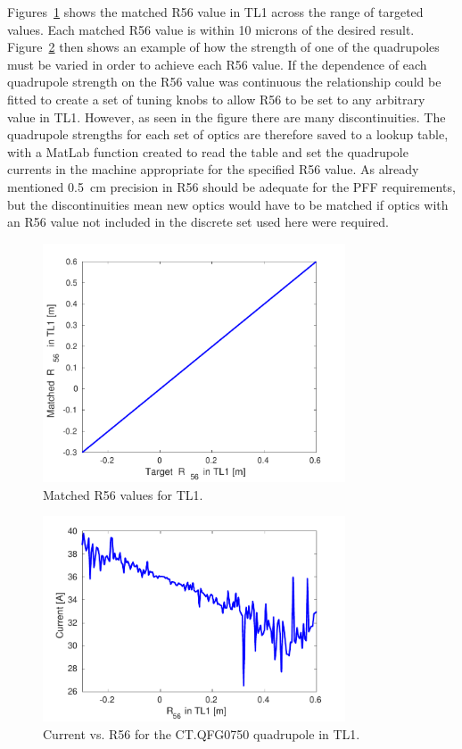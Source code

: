 Figures~\ref{f:r56MatchedVsTarget} shows the matched R56 value in TL1 across the range of targeted values. Each matched R56 value is within 10 microns of the desired result. Figure~\ref{f:CTQFG0750} then shows an example of how the strength of one of the quadrupoles must be varied in order to achieve each R56 value. If the dependence of each quadrupole strength on the R56 value was continuous the relationship could be fitted to create a set of tuning knobs to allow R56 to be set to any arbitrary value in TL1. However, as seen in the figure there are many discontinuities. The quadrupole strengths for each set of optics are therefore saved to a lookup table, with a MatLab function created to read the table and set the quadrupole currents in the machine appropriate for the specified R56 value. As already mentioned 0.5~cm precision in R56 should be adequate for the PFF requirements, but the discontinuities mean new optics would have to be matched if optics with an R56 value not included in the discrete set used here were required.

\begin{figure}
  \centering
  \includegraphics[width=0.8\textwidth]{Figures/propagation/r56MatchedVsTarget}
  \caption{Matched R56 values for TL1.}
  \label{f:r56MatchedVsTarget}
\end{figure}

\begin{figure}
  \centering
  \includegraphics[width=0.8\textwidth]{Figures/propagation/CTQFG0750}
  \caption{Current vs. R56 for the CT.QFG0750 quadrupole in TL1.}
  \label{f:CTQFG0750}
\end{figure}

